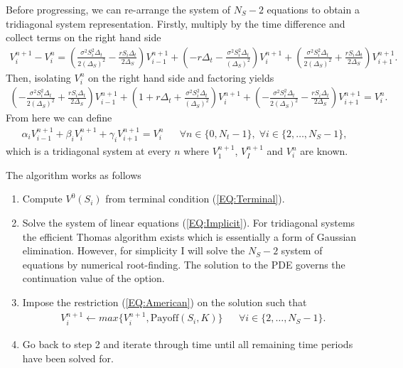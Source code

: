 \documentclass[11pt,a4paper]{article}
\begin{document}
Before progressing, we can re-arrange the system of $N_S - 2$ equations to obtain a tridiagonal system representation. Firstly, multiply by the time difference and collect terms on the right hand side
\begin{align*}
V^{n+1}_i - V^n_i = \left( \frac{\sigma^2 S_i^2 \Delta_t}{2 (\Delta_S)^2} - \frac{rS_i \Delta_t}{2 \Delta_S} \right) V_{i-1}^{n+1} + \left( -r \Delta_t - \frac{\sigma^2 S_i^2 \Delta_t}{(\Delta_S)^2} \right) V_i^{n+1} + \left( \frac{\sigma^2 S_i^2 \Delta_t}{2 (\Delta_S)^2} + \frac{rS_i \Delta_t}{2 \Delta_S} \right) V_{i+1}^{n+1}.
\end{align*}
Then, isolating $V_i^n$ on the right hand side and factoring yields
\begin{align*}
\left( -\frac{\sigma^2 S_i^2 \Delta_t}{2 (\Delta_S)^2} + \frac{rS_i \Delta_t}{2 \Delta_S} \right) V_{i-1}^{n+1}
 + \left( 1 + r \Delta_t + \frac{\sigma^2 S_i^2 \Delta_t}{(\Delta_S)^2} \right) V_i^{n+1} 
 + \left( - \frac{\sigma^2 S_i^2 \Delta_t}{2 (\Delta_S)^2} - \frac{rS_i \Delta_t}{2 \Delta_S} \right) V_{i+1}^{n+1} = V^n_i.
\end{align*}
From here we can define
\begin{align}
\alpha_i V_{i-1}^{n+1}
 + \beta_i V_i^{n+1} 
 + \gamma_i V_{i+1}^{n+1} = V^n_i && \forall n \in\{0,N_t-1\}, \; \forall i \in \{2,\ldots,N_S-1\}, \label{EQ:Implicit}
\end{align}
which is a tridiagonal system at every $n$ where $V_{1}^{n+1}$, $V_{I}^{n+1}$ and $V^n_i$ are known.

The algorithm works as follows
\begin{enumerate}
\item Compute $V^0(S_i)$ from terminal condition (\ref{EQ:Terminal}).
\item Solve the system of linear equations (\ref{EQ:Implicit}). For tridiagonal systems the efficient Thomas algorithm exists which is essentially a form of Gaussian elimination. However, for simplicity I will solve the $N_S-2$ system of equations by numerical root-finding. The solution to the PDE governs the continuation value of the option.
\item Impose the restriction (\ref{EQ:American}) on the solution such that
\begin{align*}
V^{n+1}_{i}\leftarrow max\{V^{n+1}_{i}, \text{Payoff}(S_i,K)\} && \forall i \in \{2,\ldots,N_S-1\}.
\end{align*}
\item Go back to step 2 and iterate through time until all remaining time periods have been solved for.
\end{enumerate}
\end{document}
